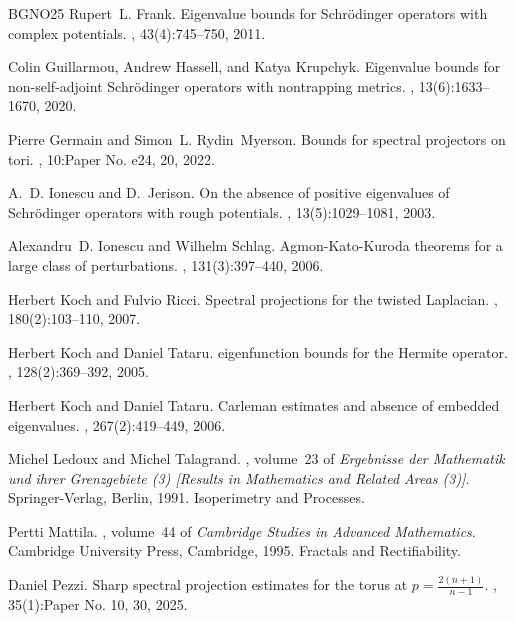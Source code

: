 \documentclass[12pt,reqno]{amsart}
\theoremstyle{definition}
\theoremstyle{remark}
\numberwithin{equation}{section}
\newcommand{\1}{\mathbbm{1}}
\begin{document}
\begin{thebibliography}{BGNO25}
Rupert~L. Frank.
\newblock Eigenvalue bounds for {S}chr\"{o}dinger operators with complex
  potentials.
, 43(4):745--750, 2011.

Colin Guillarmou, Andrew Hassell, and Katya Krupchyk.
\newblock Eigenvalue bounds for non-self-adjoint {S}chr\"{o}dinger operators
  with nontrapping metrics.
, 13(6):1633--1670, 2020.

Pierre Germain and Simon~L. Rydin~Myerson.
\newblock Bounds for spectral projectors on tori.
, 10:Paper No. e24, 20, 2022.

A.~D. Ionescu and D.~Jerison.
\newblock On the absence of positive eigenvalues of {S}chr\"{o}dinger operators
  with rough potentials.
, 13(5):1029--1081, 2003.

Alexandru~D. Ionescu and Wilhelm Schlag.
\newblock Agmon-{K}ato-{K}uroda theorems for a large class of perturbations.
, 131(3):397--440, 2006.

Herbert Koch and Fulvio Ricci.
\newblock Spectral projections for the twisted {L}aplacian.
, 180(2):103--110, 2007.

Herbert Koch and Daniel Tataru.
 eigenfunction bounds for the {H}ermite operator.
, 128(2):369--392, 2005.

Herbert Koch and Daniel Tataru.
\newblock Carleman estimates and absence of embedded eigenvalues.
, 267(2):419--449, 2006.

Michel Ledoux and Michel Talagrand.
, volume~23 of {\em Ergebnisse
  der Mathematik und ihrer Grenzgebiete (3) [Results in Mathematics and Related
  Areas (3)]}.
\newblock Springer-Verlag, Berlin, 1991.
\newblock Isoperimetry and Processes.

Pertti Mattila.
, volume~44
  of {\em Cambridge Studies in Advanced Mathematics}.
\newblock Cambridge University Press, Cambridge, 1995.
\newblock Fractals and Rectifiability.

Daniel Pezzi.
\newblock Sharp spectral projection estimates for the torus at {$p =
  \frac{2(n+1)}{n-1}$}.
, 35(1):Paper No. 10, 30, 2025.


\end{thebibliography}
\end{document}
